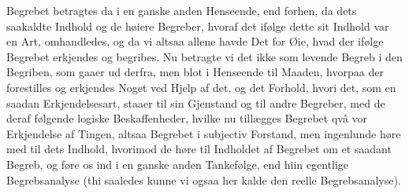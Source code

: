 \documentclass[12pt]{book}
\def\textit#1{#1}%
\newcommand{\opage}[1]{\marginnote{\footnotesize\textit{[#1]}}}
\begin{document}
Begrebet betragtes da i en ganske anden Henseende, end forhen, da dets saakaldte Indhold
og de høiere Begreber, hvoraf det ifølge dette sit Indhold var en Art, omhandledes, og
da vi altsaa allene havde Det for Øie, hvad der ifølge Begrebet erkjendes og begribes.
Nu betragte vi det ikke som levende Begreb i den Begriben, som gaaer ud derfra, men blot
i Henseende til Maaden, hvorpaa der forestilles og erkjendes Noget ved Hjelp af det, og
det Forhold, hvori det, som en saadan Erkjendelsesart, staaer til sin Gjenstand og til
andre Begreber, med de deraf følgende logiske Beskaffenheder, hvilke nu
\opage{225} tillægges Begrebet \textit{qvâ} vor Erkjendelse af Tingen, altsaa Begrebet i subjectiv
Forstand, men ingenlunde høre med til dets Indhold, hvorimod de høre til Indholdet af
Begrebet om et saadant Begreb, og føre os ind i en ganske anden Tankefølge, end hiin
egentlige Begrebsanalyse (thi saaledes kunne vi ogsaa her kalde den reelle
Begrebsanalyse).
\end{document}
